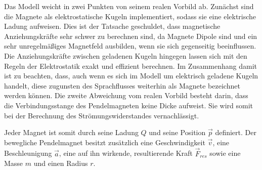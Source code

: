 Das Modell weicht in zwei Punkten von seinem realen Vorbild ab. Zunächst sind die Magnete als elektrostatische Kugeln implementiert, sodass sie eine elektrische Ladung aufweisen. Dies ist der Tatsache geschuldet, dass magnetische Anziehungskräfte sehr schwer zu berechnen sind, da Magnete Dipole sind und ein sehr unregelmäßiges Magnetfeld ausbilden, wenn sie sich gegenseitig beeinflussen. Die Anziehungskräfte zwischen geladenen Kugeln hingegen lassen sich mit den Regeln der Elektrostatik exakt und effizient berechnen. Im Zusammenhang damit ist zu beachten, dass, auch wenn es sich im Modell um elektrisch geladene Kugeln handelt, diese zugunsten des Sprachflusses weiterhin als Magnete bezeichnet werden können. Die zweite Abweichung vom realen Vorbild besteht darin, dass die Verbindungsstange des Pendelmagneten keine Dicke aufweist. Sie wird somit bei der Berechnung des Strömungswiderstandes vernachlässigt.

Jeder Magnet ist somit durch seine Ladung $Q$ und seine Position $\vec{p}$ definiert. Der bewegliche Pendelmagnet besitzt zusätzlich eine Geschwindigkeit $\vec{v}$, eine Beschleunigung $\vec{a}$, eine auf ihn wirkende, resultierende Kraft $\vec{F}_{res}$ sowie eine Masse $m$ und einen Radius $r$.

